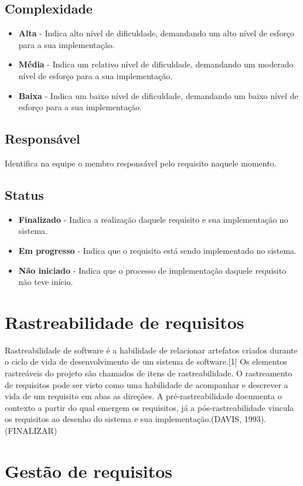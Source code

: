 \subsection{Complexidade}
\begin{itemize}
\item \textbf{Alta} - Indica alto nível de dificuldade, demandando um alto nível de esforço para a sua implementação.
\item \textbf{Média} - Indica um relativo nível de dificuldade, demandando um moderado nível de esforço para a sua implementação.
\item \textbf{Baixa} - Indica um baixo nível de dificuldade, demandando um baixo nível de esforço para a sua implementação.
\end{itemize}
\subsection{Responsável}
Identifica na equipe o membro responsável pelo requisito naquele momento.
\subsection{Status}
\begin{itemize}
\item \textbf{Finalizado} - Indica a realização daquele requisito e sua implementação no sistema.
\item \textbf{Em progresso} - Indica que o requisito está sendo implementado no sistema.
\item \textbf{Não iniciado} - Indica que o processo de implementação daquele requisito não teve início.
\end{itemize}
\section{Rastreabilidade de requisitos}
Rastreabilidade de software é a habilidade de relacionar artefatos criados durante o ciclo de vida de desenvolvimento de um sistema de software.[1] Os elementos rastreáveis do projeto são chamados de itens de rastreabilidade.
O rastreamento de requisitos pode ser visto como uma habilidade de acompanhar e descrever a vida de um requisito em abas as direções. A pré-rastreabilidade documenta o contexto a partir do qual emergem os requisitos, já a pós-rastreabilidade vincula os requisitos ao desenho do sistema e sua implementação.(DAVIS, 1993).
(FINALIZAR)
\section{Gestão de requisitos}